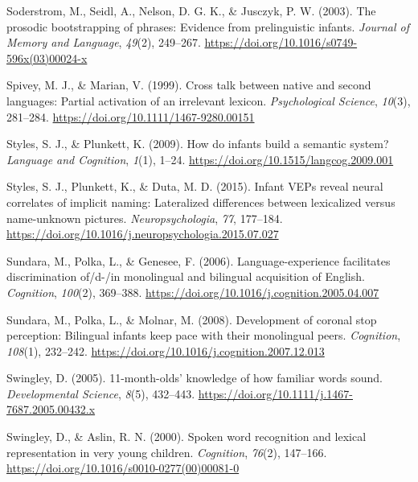 \documentclass[
  12pt,
  b5paperpaper,
  twoside]{scrreprt}
\newlength{\cslhangindent}
\newlength{\cslentryspacingunit} %
\newenvironment{CSLReferences}[2] %
 {%
  \setlength{\parindent}{0pt}
  \ifodd #1
  \let\oldpar\par
  \def\par{\hangindent=\cslhangindent\oldpar}
  \fi
  \setlength{\parskip}{#2\cslentryspacingunit}
 }%
 {}
\begin{document}
\begin{CSLReferences}{1}{0}
\leavevmode{}%
Soderstrom, M., Seidl, A., Nelson, D. G. K., \& Jusczyk, P. W. (2003).
The prosodic bootstrapping of phrases: Evidence from prelinguistic
infants. \emph{Journal of Memory and Language}, \emph{49}(2), 249--267.
\url{https://doi.org/10.1016/s0749-596x(03)00024-x}

\leavevmode{}%
Spivey, M. J., \& Marian, V. (1999). Cross talk between native and
second languages: Partial activation of an irrelevant lexicon.
\emph{Psychological Science}, \emph{10}(3), 281--284.
\url{https://doi.org/10.1111/1467-9280.00151}

\leavevmode{}%
Styles, S. J., \& Plunkett, K. (2009). How do infants build a semantic
system? \emph{Language and Cognition}, \emph{1}(1), 1--24.
\url{https://doi.org/10.1515/langcog.2009.001}

\leavevmode{}%
Styles, S. J., Plunkett, K., \& Duta, M. D. (2015). Infant {VEPs} reveal
neural correlates of implicit naming: Lateralized differences between
lexicalized versus name-unknown pictures. \emph{Neuropsychologia},
\emph{77}, 177--184.
\url{https://doi.org/10.1016/j.neuropsychologia.2015.07.027}

\leavevmode{}%
Sundara, M., Polka, L., \& Genesee, F. (2006). Language-experience
facilitates discrimination of/d-/in monolingual and bilingual
acquisition of {English}. \emph{Cognition}, \emph{100}(2), 369--388.
\url{https://doi.org/10.1016/j.cognition.2005.04.007}

\leavevmode{}%
Sundara, M., Polka, L., \& Molnar, M. (2008). Development of coronal
stop perception: Bilingual infants keep pace with their monolingual
peers. \emph{Cognition}, \emph{108}(1), 232--242.
\url{https://doi.org/10.1016/j.cognition.2007.12.013}

\leavevmode{}%
Swingley, D. (2005). 11-month-olds' knowledge of how familiar words
sound. \emph{Developmental Science}, \emph{8}(5), 432--443.
\url{https://doi.org/10.1111/j.1467-7687.2005.00432.x}

\leavevmode{}%
Swingley, D., \& Aslin, R. N. (2000). Spoken word recognition and
lexical representation in very young children. \emph{Cognition},
\emph{76}(2), 147--166.
\url{https://doi.org/10.1016/s0010-0277(00)00081-0}


\end{CSLReferences}
\end{document}
